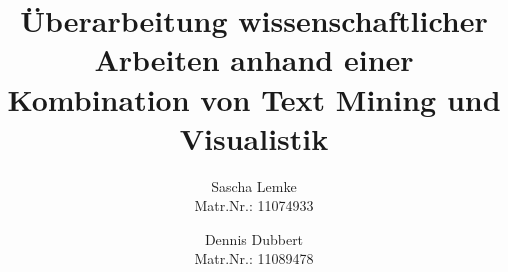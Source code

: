 \title{\"Uberarbeitung wissenschaftlicher Arbeiten anhand einer Kombination von Text Mining und Visualistik}


\author{Sascha Lemke\\ %
        \scriptsize Matr.Nr.: 11074933 %
\and Dennis Dubbert\\ %
     \scriptsize Matr.Nr.: 11089478}

